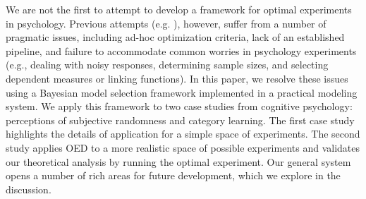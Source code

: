 \documentclass{article}
\newcommand{\ndg}[1]{\textcolor{Green}{[ndg: #1]}}
\begin{document}
We are not the first to attempt to develop a framework for optimal experiments in psychology.
Previous attempts (e.g. \cite{Myung2009}), however, suffer from a number of pragmatic issues, including ad-hoc optimization criteria, lack of an established pipeline, and failure to accommodate common worries in psychology experiments (e.g., dealing with noisy responses, determining sample sizes, and selecting dependent measures or linking functions).
In this paper, we resolve these issues using a Bayesian model selection framework implemented in a practical modeling system.
We apply this framework to two case studies from cognitive psychology: perceptions of subjective randomness and category learning.
The first case study highlights the details of application for a simple space of experiments.
The second study applies OED to a more realistic space of possible experiments and validates our theoretical analysis by running the optimal experiment.
Our general system opens a number of rich areas for future development, which we explore in the discussion.

\end{document}
